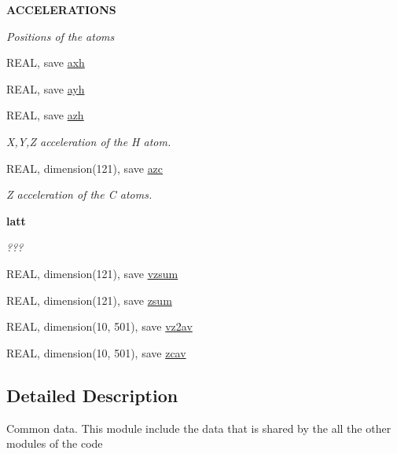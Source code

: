 \begin{Indent}{\bf ACCELERATIONS}\par
{\em \label{_amgrpa5fdc1668c426cc06df5727a473ad21c}
Positions of the atoms }\begin{DoxyCompactItemize}
\item 
REAL, save \hyperlink{namespace_common_data_a92452d88a25f1d941bd33406eb4219ee}{axh}
\item 
REAL, save \hyperlink{namespace_common_data_a4256419c9e9f412bf3d0f5984841a834}{ayh}
\item 
REAL, save \hyperlink{namespace_common_data_ad7ceb7c20d99e27c42aa1b1d3b579262}{azh}
\begin{DoxyCompactList}\small\item\em X,Y,Z acceleration of the H atom. \item\end{DoxyCompactList}\item 
REAL, dimension(121), save \hyperlink{namespace_common_data_a500e1c90c8246eced8ce0a8338de0c84}{azc}
\begin{DoxyCompactList}\small\item\em Z acceleration of the C atoms. \item\end{DoxyCompactList}\end{DoxyCompactItemize}
\end{Indent}
\begin{Indent}{\bf latt}\par
{\em \label{_amgrp5d1e6bead47fd4265bb6143ccbade00a}
??? }\begin{DoxyCompactItemize}
\item 
REAL, dimension(121), save \hyperlink{namespace_common_data_a3c7cb8fe8980c16677d67a91d4253347}{vzsum}
\item 
REAL, dimension(121), save \hyperlink{namespace_common_data_a0ce423b52c02935927c0328fb2a8a869}{zsum}
\item 
REAL, dimension(10, 501), save \hyperlink{namespace_common_data_a98fb8e9102a9fe8002bca31265299a9a}{vz2av}
\item 
REAL, dimension(10, 501), save \hyperlink{namespace_common_data_a9ab21d0d353de9bb788831e27d9a5130}{zcav}
\end{DoxyCompactItemize}
\end{Indent}


\subsection{Detailed Description}
Common data. This module include the data that is shared by the all the other modules of the code 


